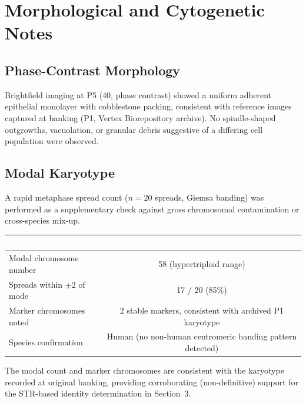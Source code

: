 
\section{Morphological and Cytogenetic Notes}

\subsection{Phase-Contrast Morphology}

Brightfield imaging at P5 (40\texttimes, phase contrast) showed a uniform adherent
epithelial monolayer with cobblestone packing, consistent with reference images captured
at banking (P1, Vertex Biorepository archive). No spindle-shaped outgrowths, vacuolation,
or granular debris suggestive of a differing cell population were observed.

\begin{center}
\end{center}

\subsection{Modal Karyotype}

A rapid metaphase spread count ($n=20$ spreads, Giemsa banding) was performed as a
supplementary check against gross chromosomal contamination or cross-species mix-up.

\begin{table}[h!]
  \centering
  \renewcommand{\arraystretch}{1.25}
  \begin{tabularx}{\textwidth}{@{} X c @{}}
    \toprule
    \rowcolor{labnavy}
    \textcolor{white}{\textbf{Metric}} & \textcolor{white}{\textbf{Observation}} \\
    \midrule
    Modal chromosome number & 58 (hypertriploid range) \\
    Spreads within $\pm 2$ of mode & 17 / 20 (85\%) \\
    Marker chromosomes noted & 2 stable markers, consistent with archived P1 karyotype \\
    Species confirmation & Human (no non-human centromeric banding pattern detected) \\
    \bottomrule
  \end{tabularx}
\end{table}

The modal count and marker chromosomes are consistent with the karyotype recorded at
original banking, providing corroborating (non-definitive) support for the STR-based
identity determination in Section~3.
